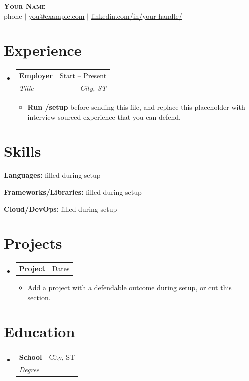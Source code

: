 \documentclass[letterpaper,10.9pt]{article}
\makeatletter
\newcommand{\resumeItem}[1]{
  \item\small{
    {#1 \vspace{-2pt}}
  }
}
\newcommand{\resumeSubheading}[4]{
  \vspace{-2pt}\item
    \begin{tabular*}{0.97\textwidth}[t]{l@{\extracolsep{\fill}}r}
      \textbf{#1} & #2 \\
      \textit{\small#3} & \textit{\small #4} \\
    \end{tabular*}\vspace{-7pt}
}
\newcommand{\resumeProjectHeading}[2]{
    \item
    \begin{tabular*}{0.97\textwidth}{l@{\extracolsep{\fill}}r}
      \small#1 & #2 \\
    \end{tabular*}\vspace{-7pt}
}
\newcommand{\resumeSubHeadingListStart}{\begin{itemize}[leftmargin=0.15in, label={}]}
\newcommand{\resumeSubHeadingListEnd}{\end{itemize}}
\newcommand{\resumeItemListStart}{\begin{itemize}}
\newcommand{\resumeItemListEnd}{\end{itemize}\vspace{-5pt}}
\makeatother
\begin{document}

\begin{center}
    \textbf{\Huge \scshape Your Name} \\ \vspace{1pt}
    \small phone $|$ \href{mailto:you@example.com}{\underline{you@example.com}} $|$
    {\href{https://www.linkedin.com/in/your-handle/}{\underline{linkedin.com/in/your-handle/}}}
\end{center}

\section{Experience}
  \resumeSubHeadingListStart
    \resumeSubheading
      {\textbf{Employer}}{Start -- Present}
      {Title}{City, ST}
      \resumeItemListStart
        \resumeItem{\textbf{Run /setup} before sending this file, and replace this placeholder with interview-sourced experience that you can defend.}
      \resumeItemListEnd
  \resumeSubHeadingListEnd

\section{Skills}
 \begin{itemize}[leftmargin=0.15in, label={}, itemsep=-2pt ]
    \small{
    \item \textbf{Languages:} filled during setup
    \item \textbf{Frameworks/Libraries:} filled during setup
    \item \textbf{Cloud/DevOps:} filled during setup
    }
\end{itemize}

\section{Projects}
    \resumeSubHeadingListStart
      \resumeProjectHeading
          {\textbf{Project}}{Dates}
          \resumeItemListStart
            \resumeItem{Add a project with a defendable outcome during setup, or cut this section.}
          \resumeItemListEnd
  \resumeSubHeadingListEnd

\section{Education}
  \resumeSubHeadingListStart
    \resumeSubheading
      {School}{City, ST}
      {Degree}{}
  \resumeSubHeadingListEnd
\end{document}
